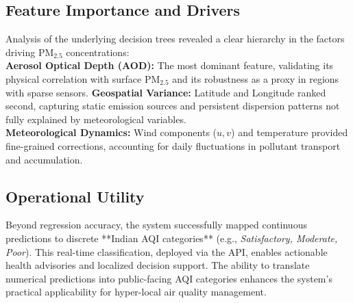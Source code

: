 \documentclass[conference]{IEEEtran}
\begin{document}
\subsection{Feature Importance and Drivers}
Analysis of the underlying decision trees revealed a clear hierarchy in the factors driving $\text{PM}_{2.5}$ concentrations:\\
\textbf{Aerosol Optical Depth (AOD):} The most dominant feature, validating its physical correlation with surface PM$_{2.5}$ and its robustness as a proxy in regions with sparse sensors.
\textbf{Geospatial Variance:} Latitude and Longitude ranked second, capturing static emission sources and persistent dispersion patterns not fully explained by meteorological variables.\\
\textbf{Meteorological Dynamics:} Wind components ($u, v$) and temperature provided fine-grained corrections, accounting for daily fluctuations in pollutant transport and accumulation.


\subsection{Operational Utility}
Beyond regression accuracy, the system successfully mapped continuous predictions to discrete **Indian AQI categories** (e.g., \textit{Satisfactory, Moderate, Poor}). This real-time classification, deployed via the API, enables actionable health advisories and localized decision support. The ability to translate numerical predictions into public-facing AQI categories enhances the system’s practical applicability for hyper-local air quality management.
\end{document}
